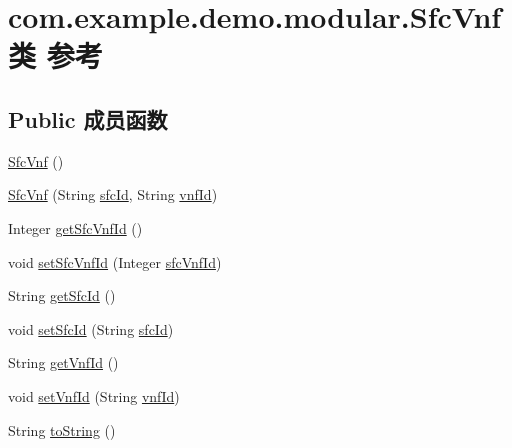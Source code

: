 \hypertarget{classcom_1_1example_1_1demo_1_1modular_1_1_sfc_vnf}{}\section{com.\+example.\+demo.\+modular.\+Sfc\+Vnf类 参考}
\label{classcom_1_1example_1_1demo_1_1modular_1_1_sfc_vnf}
\subsection*{Public 成员函数}
\begin{DoxyCompactItemize}
\item 
\mbox{\hyperlink{classcom_1_1example_1_1demo_1_1modular_1_1_sfc_vnf_a6142d12fc8fe040e067bb43d5181ac8a}{Sfc\+Vnf}} ()
\item 
\mbox{\hyperlink{classcom_1_1example_1_1demo_1_1modular_1_1_sfc_vnf_aacc139a43e7e1a2e9a41a7f49fec0e65}{Sfc\+Vnf}} (String \mbox{\hyperlink{classcom_1_1example_1_1demo_1_1modular_1_1_sfc_vnf_adef4bb1d23bc85112f728d45f99be998}{sfc\+Id}}, String \mbox{\hyperlink{classcom_1_1example_1_1demo_1_1modular_1_1_sfc_vnf_a5220d16aa48e52d0b804a14309d79117}{vnf\+Id}})
\item 
Integer \mbox{\hyperlink{classcom_1_1example_1_1demo_1_1modular_1_1_sfc_vnf_a44be5812302aa60d2593f6426582f5ae}{get\+Sfc\+Vnf\+Id}} ()
\item 
void \mbox{\hyperlink{classcom_1_1example_1_1demo_1_1modular_1_1_sfc_vnf_ab35691b1b92521b5466a95d58cc0cc4f}{set\+Sfc\+Vnf\+Id}} (Integer \mbox{\hyperlink{classcom_1_1example_1_1demo_1_1modular_1_1_sfc_vnf_ada8fd49d169bb4d1f223b5a77be4a230}{sfc\+Vnf\+Id}})
\item 
String \mbox{\hyperlink{classcom_1_1example_1_1demo_1_1modular_1_1_sfc_vnf_a8a5d103e470a366e295d60ae2c22fa6a}{get\+Sfc\+Id}} ()
\item 
void \mbox{\hyperlink{classcom_1_1example_1_1demo_1_1modular_1_1_sfc_vnf_adad9adfb168cfbe40a9b1a1fe82d96cf}{set\+Sfc\+Id}} (String \mbox{\hyperlink{classcom_1_1example_1_1demo_1_1modular_1_1_sfc_vnf_adef4bb1d23bc85112f728d45f99be998}{sfc\+Id}})
\item 
String \mbox{\hyperlink{classcom_1_1example_1_1demo_1_1modular_1_1_sfc_vnf_ad4e19685d65a35e1b9c3eb6c7017667d}{get\+Vnf\+Id}} ()
\item 
void \mbox{\hyperlink{classcom_1_1example_1_1demo_1_1modular_1_1_sfc_vnf_a637812a17ba074282bdb43098353cccb}{set\+Vnf\+Id}} (String \mbox{\hyperlink{classcom_1_1example_1_1demo_1_1modular_1_1_sfc_vnf_a5220d16aa48e52d0b804a14309d79117}{vnf\+Id}})
\item 
String \mbox{\hyperlink{classcom_1_1example_1_1demo_1_1modular_1_1_sfc_vnf_abeb0e6f5c0518a373e59981e3e328d03}{to\+String}} ()
\end{DoxyCompactItemize}
